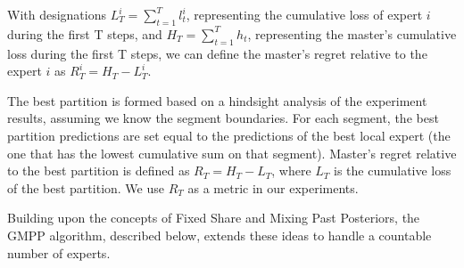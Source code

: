 \documentclass[12pt, twoside]{article}
\begin{document}
With designations $L_T^i = \sum_{t = 1}^T l_t^i$, representing the cumulative loss of expert $i$ during the first T steps, and $H_T = \sum_{t = 1}^T h_t$, 
representing the master's cumulative loss during the first T steps, we can define the master's regret relative to the expert $i$ as $R^i_T = H_T - L^i_T$. 

The best partition is formed based on a hindsight analysis of the experiment results, assuming we know the segment boundaries. For each segment, the best partition predictions are set equal to the predictions of the best local expert (the one that has the lowest cumulative sum on that segment). Master's regret relative to the best partition is defined as $R_T= H_T - L_T$, where $L_T$ is the cumulative loss of the best partition. We use $R_T$ as a metric in our experiments.

\vspace{3mm}
 Building upon the concepts of Fixed Share and Mixing Past Posteriors, the GMPP algorithm, described below, extends these ideas to handle a countable number of experts. 
\end{document}
